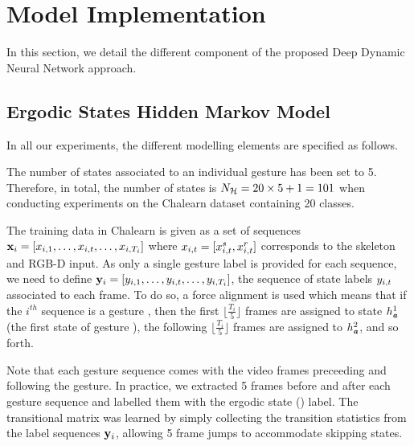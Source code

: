 

\section{Model Implementation}
\label{sec:ModelImplementation}

In this section, we detail the different component of the proposed Deep Dynamic Neural Network approach.

\subsection{Ergodic States Hidden Markov Model}

In all our experiments, the different modelling elements are specified as follows.

The number of states \nsig{} associated to an individual gesture has been set to 5.
Therefore, in total, the number of states is $N_{\mathcal{H}} = 20 \times 5 + 1 = 101$
when conducting  experiments on the Chalearn dataset containing 20 classes.

The training data in Chalearn is given as a set of sequences
$\mathbf x_i=[x_{i,1}, \ldots,x_{i,t},\ldots, x_{i,T_i}]$
where $x_{i,t}=[x_{i,t}^s, x_{i,t}^r]$ corresponds to the skeleton and RGB-D input.
%
As only a single gesture label is provided for each sequence, we need to define
$\mathbf y_i=[y_{i,1}, \ldots,y_{i,t},\ldots, y_{i,T_i}]$,
the sequence of state labels $y_{i,t}$ associated to each frame.
%
To do so, a force alignment is used which means that if the $i^{th}$ sequence is a gesture \gesturea{}, then the first $\lfloor \frac{T_i}{5} \rfloor$ frames are assigned to state $h_{\textbf{\emph{a}}}^1$ (the first state of gesture \gesturea{}),
the following $\lfloor \frac{T_i}{5} \rfloor$ frames are assigned to $h_{\textbf{\emph{a}}}^2$, and so forth.

Note that each gesture sequence comes with the video frames preceeding and following the gesture.
In practice, we extracted 5 frames before and after each gesture sequence and labelled them
with the ergodic state (\ergodicstate) label.
%
The transitional matrix \transitionmatrix{} was learned by simply  collecting the transition statistics from the label sequences $\mathbf y_i$, allowing 5 frame jumps to accommodate skipping states.

%
%


